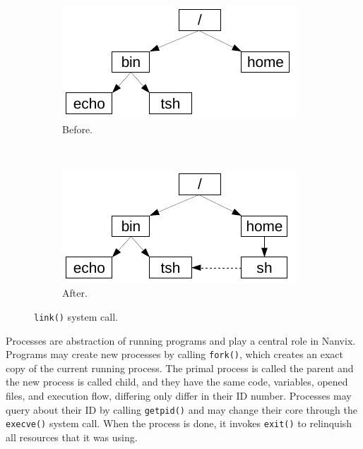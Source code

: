 		\begin{figure}[b]
			\centering
			\begin{subfigure}[b]{0.35\linewidth}
				\includegraphics[width=\textwidth]{img/link-1}
				\caption{Before.}
			\end{subfigure} ~ 
			\begin{subfigure}[b]{0.35\linewidth}
				\includegraphics[width=\textwidth]{img/link-2}
				\caption{After.}
			\end{subfigure}
			\caption{\texttt{link()} system call.}
			\label{figure: link system call}
		\end{figure}

		Processes are abstraction of running programs and play a central
		role in Nanvix. Programs may create new processes by calling
		\texttt{fork()}, which creates an exact copy of the current running
		process. The primal process is called the parent and the new process
		is called child, and they have the same code, variables, opened
		files, and execution flow, differing only differ in their ID number.
		Processes may query about their ID by calling \texttt{getpid()} and
		may change their core through the \texttt{execve()} system call.
		When the process is done, it invokes \texttt{exit()} to relinquish
		all resources that it was using.

